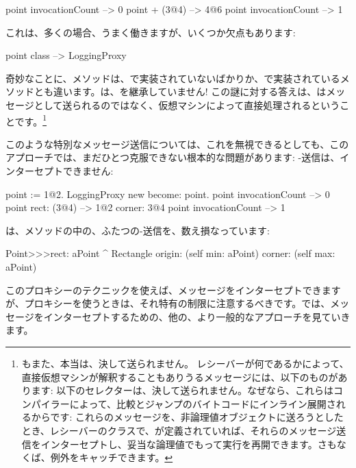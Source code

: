 \documentclass[a4paper,10pt,twoside]{book}
\begin{document}
\begin{code}{}
point invocationCount --> 0
point + (3@4)             --> 4@6
point invocationCount --> 1
\end{code}

これは、多くの場合、うまく働きますが、いくつか欠点もあります:
\begin{code}{}
point class --> LoggingProxy
\end{code}
奇妙なことに、メソッドは、で実装されていないばかりか、で実装されているメソッドとも違います。は、を継承していません!
この謎に対する答えは、はメッセージとして送られるのではなく、仮想マシンによって直接処理されるということです。\footnote{もまた、本当は、決して送られません。
レシーバーが何であるかによって、直接仮想マシンが解釈することもありうるメッセージには、以下のものがあります:
\ct{+- < > <= >= = ~= * / \ ==}
以下のセレクターは、決して送られません。なぜなら、これらはコンパイラーによって、比較とジャンプのバイトコードにインライン展開されるからです:
これらのメッセージを、非論理値オブジェクトに送ろうとしたとき、レシーバーのクラスで、が定義されていれば、それらのメッセージ送信をインターセプトし、妥当な論理値でもって実行を再開できます。さもなくば、例外をキャッチできます。
}%

このような特別なメッセージ送信については、これを無視できるとしても、このアプローチでは、まだひとつ克服できない根本的な問題があります: \self-送信は、インターセプトできません:
\begin{code}{}
point := 1@2.
LoggingProxy new become: point.
point invocationCount --> 0
point rect: (3@4)        --> 1@2 corner: 3@4
point invocationCount --> 1
\end{code}

は、メソッドの中の、ふたつの\self-送信を、数え損なっています:
\begin{code}{}
Point>>>rect: aPoint 
	^ Rectangle  origin: (self min: aPoint) corner: (self max: aPoint)
\end{code}

このプロキシーのテクニックを使えば、メッセージをインターセプトできますが、プロキシーを使うときは、それ特有の制限に注意するべきです。では、メッセージをインターセプトするための、他の、より一般的なアプローチを見ていきます。
\end{document}
